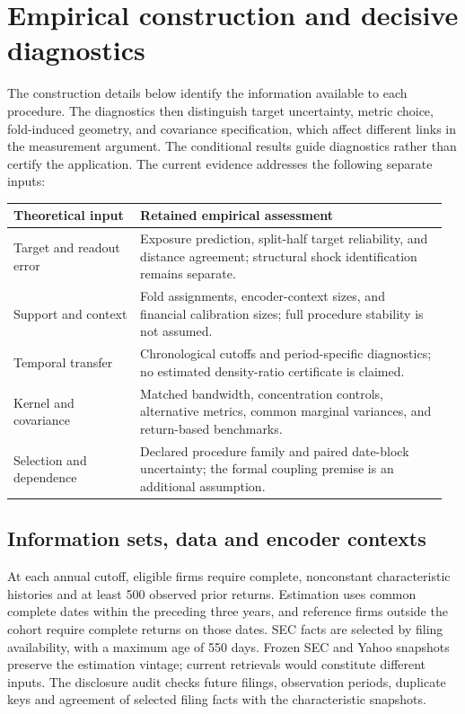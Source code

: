 \documentclass[11pt]{article}
\begin{document}
\section{Empirical construction and decisive
diagnostics}\label{sec:empirical-supplement}
The construction details below identify the information available to each
procedure. The diagnostics then distinguish target uncertainty, metric choice,
fold-induced geometry, and covariance specification, which affect different
links in the measurement argument.
The conditional results guide diagnostics rather than certify the application.
The current evidence addresses the following separate inputs:
\begin{center}\small
  \begin{tabular}{@{}p{0.28\linewidth}p{0.68\linewidth}@{}}
    \toprule
    Theoretical input & Retained empirical assessment\\
    \midrule
    Target and readout error & Exposure prediction, split-half target
    reliability,
    and distance agreement; structural shock identification remains separate.\\
    Support and context & Fold assignments, encoder-context sizes, and financial
    calibration sizes; full procedure stability is not assumed.\\
    Temporal transfer & Chronological cutoffs and period-specific diagnostics;
    no estimated density-ratio certificate is claimed.\\
    Kernel and covariance & Matched bandwidth, concentration
    controls, alternative
    metrics, common marginal variances, and return-based benchmarks.\\
    Selection and dependence & Declared procedure family and paired date-block
    uncertainty; the formal coupling premise is an additional assumption.\\
    \bottomrule
  \end{tabular}
\end{center}

\subsection{Information sets, data and encoder contexts}
At each annual cutoff, eligible firms require complete, nonconstant
characteristic histories and at least 500 observed prior returns. Estimation
uses common complete dates within the preceding three years, and reference
firms outside the cohort require complete returns on those dates. SEC facts are
selected by filing availability, with a maximum age of 550 days. Frozen SEC and
Yahoo snapshots preserve the estimation vintage; current retrievals would
constitute different inputs. The disclosure audit checks future filings,
observation periods, duplicate keys and agreement of selected filing facts with
the characteristic snapshots.
\end{document}
